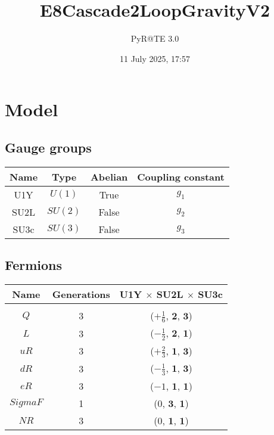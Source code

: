 \documentclass[12pt]{article}
\title{E8Cascade2LoopGravityV2}
\author{PyR@TE 3.0}
\date{11 July 2025, 17:57}
\begin{document}
    \maketitle
    \tableofcontents
    \clearpage

\section{Model}

\subsection{Gauge groups}

\begin{table}[h]
\renewcommand{\arraystretch}{1.3}
\centering
\begin{tabular}{c@{\hskip .66cm}c@{\hskip .66cm}c@{\hskip .5cm}c}
\hline
Name & Type & Abelian & Coupling constant \\ \hline
U1Y & $U(1)$ & True & $g_{1}$ \\
SU2L & $SU(2)$ & False & $g_{2}$ \\
SU3c & $SU(3)$ & False & $g_{3}$ \\ \hline
\end{tabular}
\end{table}

\subsection{Fermions}

\begin{table}[h]
\renewcommand{\arraystretch}{1.15}
\centering
\begin{tabular}{c@{\hskip .66cm}c@{\hskip .66cm}c}
\hline
Name & Generations & U1Y $\times$ SU2L $\times$ SU3c\\ \hline \\ [-2ex]
$Q$ & 3 & ($+\frac{1}{6}$, $\mathbf{2}$, $\mathbf{3}$) \\[.2cm]
$L$ & 3 & ($- \frac{1}{2}$, $\mathbf{2}$, $\mathbf{1}$) \\[.2cm]
$uR$ & 3 & ($+\frac{2}{3}$, $\mathbf{1}$, $\mathbf{3}$) \\[.2cm]
$dR$ & 3 & ($- \frac{1}{3}$, $\mathbf{1}$, $\mathbf{3}$) \\[.2cm]
$eR$ & 3 & ($-1$, $\mathbf{1}$, $\mathbf{1}$) \\[.2cm]
$SigmaF$ & 1 & ($0$, $\mathbf{3}$, $\mathbf{1}$) \\[.2cm]
$NR$ & 3 & ($0$, $\mathbf{1}$, $\mathbf{1}$) \\[.1cm] \hline
\end{tabular}
\end{table}
\end{document}
